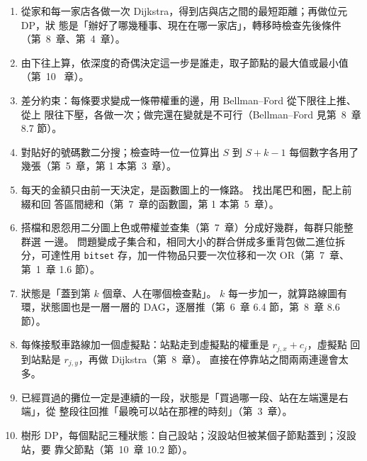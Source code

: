 \begin{enumerate}
~14~章例題二「從兩端各算一次」同一類想法）。
\item 從家和每一家店各做一次 Dijkstra，得到店與店之間的最短距離；再做位元 DP，狀
態是「辦好了哪幾種事、現在在哪一家店」，轉移時檢查先後條件（第~8~章、第~4~章）。
\item 由下往上算，依深度的奇偶決定這一步是誰走，取子節點的最大值或最小值（第~10~
章）。
\item 差分約束：每條要求變成一條帶權重的邊，用 Bellman--Ford 從下限往上推、從上
限往下壓，各做一次；做完還在變就是不可行（Bellman--Ford 見第~8~章 8.7 節）。
\item 對貼好的號碼數二分搜；檢查時一位一位算出 $S$ 到 $S + k - 1$ 每個數字各用了
幾張（第~5~章，第 1 本第~3~章）。
\item 每天的金額只由前一天決定，是函數圖上的一條路。 找出尾巴和圈，配上前綴和回
答區間總和（第~7~章的函數圖，第 1 本第~5~章）。
\item 搭檔和恩怨用二分圖上色或帶權並查集（第~7~章）分成好幾群，每群只能整群選
一邊。 問題變成子集合和，相同大小的群合併成多重背包做二進位拆分，可達性用
\texttt{bitset} 存，加一件物品只要一次位移和一次 OR（第~7~章、第~1~章 1.6 節）。
\item 狀態是「蓋到第 $k$ 個章、人在哪個檢查點」。 $k$ 每一步加一，就算路線圖有
環，狀態圖也是一層一層的 DAG，逐層推（第~6~章 6.4 節，第~8~章 8.6 節）。
\item 每條接駁車路線加一個虛擬點：站點走到虛擬點的權重是 $r_{j,x} + c_j$，虛擬點
回到站點是 $r_{j,y}$，再做 Dijkstra（第~8~章）。 直接在停靠站之間兩兩連邊會太多。
\item 已經買過的攤位一定是連續的一段，狀態是「買過哪一段、站在左端還是右端」，從
整段往回推「最晚可以站在那裡的時刻」（第~3~章）。
\item 樹形 DP，每個點記三種狀態：自己設站；沒設站但被某個子節點蓋到；沒設站，要
靠父節點（第~10~章 10.2 節）。
\end{enumerate}
